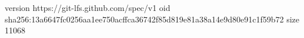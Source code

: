 version https://git-lfs.github.com/spec/v1
oid sha256:13a6647fc0256aa1ee750acffca36742f85d819e81a38a14e9d80e91c1f59b72
size 11068
